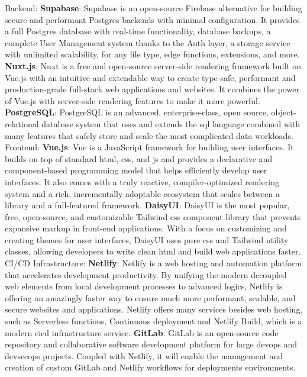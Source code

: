 \documentclass[../main.tex]{subfiles}
\begin{document}
\begin{outline}
 \1 Backend:
   \2 \textbf{Supabase}: Supabase is an open-source Firebase alternative for building secure and performant Postgres backends with minimal configuration. It provides a full Postgres database with real-time functionality, database backups, a complete User Management system thanks to the Auth layer, a storage service with unlimited scalability, for any file type, edge functions, extensions, and more.\cite{supabase}
   \2 \textbf{Nuxt.js}: Nuxt is a free and open-source server-side rendering framework built on Vue.js with an intuitive and extendable way to create type-safe, performant and production-grade full-stack web applications and websites. It combines the power of Vue.js with server-side rendering features to make it more powerful.\cite{nuxt}
    \2 \textbf{PostgreSQL}: PostgreSQL is an advanced, enterprise-class, open source, object-relational database system that uses and extends the \acrshort{sql} language combined with many features that safely store and scale the most complicated data workloads.\cite{nuxt}
    \newpage
 \1 Frontend:
   \2 \textbf{Vue.js}: Vue is a JavaScript framework for building user interfaces. It builds on top of standard \acrshort{html}, \acrshort{css}, and \acrshort{js} and provides a declarative and component-based programming model that helps efficiently develop user interfaces. It also comes with a truly reactive, compiler-optimized rendering system and a rich, incrementally adoptable ecosystem that scales between a library and a full-featured framework.\cite{vuejs}
   \2 \textbf{DaisyUI}: DaisyUI is the most popular, free, open-source, and customizable Tailwind \acrshort{css} component library that prevents expansive markup in front-end applications.\cite{daisyui} With a focus on customizing and creating themes for user interfaces, DaisyUI uses pure \acrshort{css} and Tailwind utility classes, allowing developers to write clean \acrshort{html} and build web applications faster.\cite{daisyui2}
 \1 CI/CD Infrastructure:
    \2 \textbf{Netlify}: Netlify is a web hosting and automation platform that accelerates development productivity. By unifying the modern decoupled web elements from local development processes to advanced logics, Netlify is offering an amazingly faster way to ensure much more performant, scalable, and secure websites and applications. Netlify offers many services besides web hosting, such as Serverless functions, Continuous deployment and Netlify Build, which is a modern \acrshort{cicd} infrastructure service.\cite{netlify}
    \2 \textbf{GitLab}: GitLab is an open-source code repository and collaborative software development platform for large \acrshort{devops} and \acrshort{devsecops} projects.\cite{gitLab} Coupled with Netlify, it will enable the management and creation of custom GitLab and Netlify workflows for deployments environments.

\end{outline}
\end{document}
